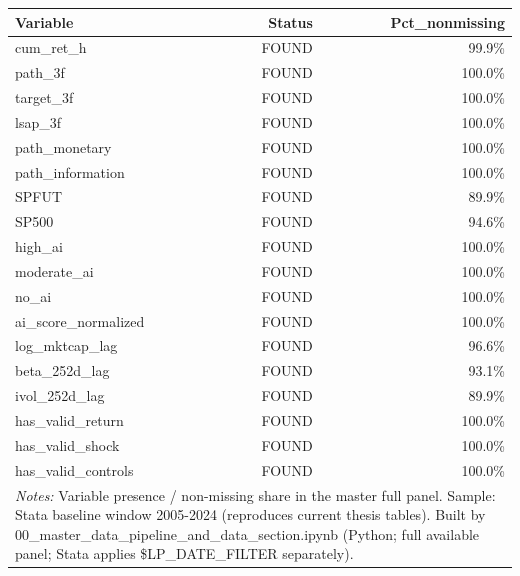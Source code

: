 \begin{tabular}{lrr}
\toprule
Variable & Status & Pct\_nonmissing \\
\midrule
cum\_ret\_h & FOUND & 99.9\% \\
path\_3f & FOUND & 100.0\% \\
target\_3f & FOUND & 100.0\% \\
lsap\_3f & FOUND & 100.0\% \\
path\_monetary & FOUND & 100.0\% \\
path\_information & FOUND & 100.0\% \\
SPFUT & FOUND & 89.9\% \\
SP500 & FOUND & 94.6\% \\
high\_ai & FOUND & 100.0\% \\
moderate\_ai & FOUND & 100.0\% \\
no\_ai & FOUND & 100.0\% \\
ai\_score\_normalized & FOUND & 100.0\% \\
log\_mktcap\_lag & FOUND & 96.6\% \\
beta\_252d\_lag & FOUND & 93.1\% \\
ivol\_252d\_lag & FOUND & 89.9\% \\
has\_valid\_return & FOUND & 100.0\% \\
has\_valid\_shock & FOUND & 100.0\% \\
has\_valid\_controls & FOUND & 100.0\% \\
\bottomrule
\multicolumn{3}{p{0.95\linewidth}}{\footnotesize \textit{Notes:} Variable presence / non-missing share in the master full panel. Sample: Stata baseline window 2005-2024 (reproduces current thesis tables). Built by 00\_master\_data\_pipeline\_and\_data\_section.ipynb (Python; full available panel; Stata applies \$LP\_DATE\_FILTER separately).} \\
\end{tabular}
